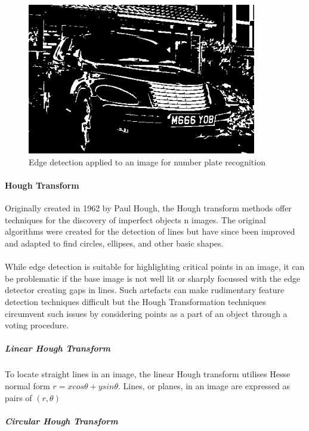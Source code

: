 	\begin{figure}[h!]
		\centering
		\includegraphics[width=10cm]{../images/anpr.jpg}
		\caption{Edge detection applied to an image for number plate recognition}
		\label{fig:anpr}
	\end{figure} 
	\paragraph{Hough Transform}
	Originally created in 1962 by Paul Hough, the Hough transform methods offer techniques for the discovery of imperfect objects n images. The original algorithms were created for the detection of lines but have since been improved and adapted to find circles, ellipses, and other basic shapes. 
	\\\\
	While edge detection is suitable for highlighting critical points in an image, it can be problematic if the base image is not well lit or sharply focussed  with the edge detector creating gaps in lines. Such artefacts can make rudimentary feature detection techniques difficult but the Hough Transformation techniques circumvent such issues by considering points as a part of an object through a voting procedure.
	\subparagraph{Linear Hough Transform}
	To locate straight lines in an image, the linear Hough transform utilises Hesse normal form $r = x cos \theta + y sin \theta$. Lines, or planes, in an image are expressed as pairs of $(r, \theta)$ 
	\subparagraph{Circular Hough Transform}
	
